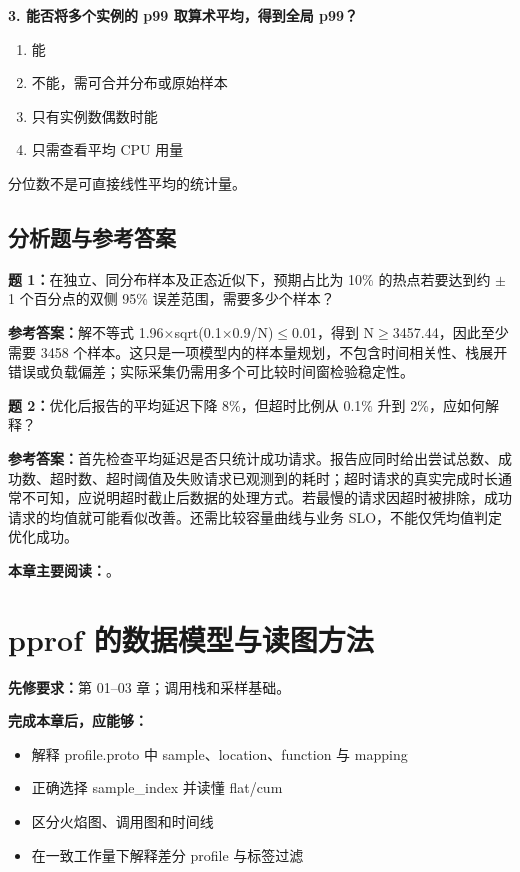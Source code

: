 \documentclass[UTF8,fontset=fandol,openany,11pt]{ctexbook}
\begin{document}
\noindent\textbf{3. 能否将多个实例的 p99 取算术平均，得到全局 p99？}
\begin{enumerate}[label=\Alph*.]
\item 能
\item 不能，需可合并分布或原始样本
\item 只有实例数偶数时能
\item 只需查看平均 CPU 用量
\end{enumerate}
分位数不是可直接线性平均的统计量。

\section{分析题与参考答案}
\noindent\textbf{题 1：}在独立、同分布样本及正态近似下，预期占比为 10\% 的热点若要达到约 \ensuremath{\pm}1 个百分点的双侧 95\% 误差范围，需要多少个样本？

\noindent\textbf{参考答案：}解不等式 1.96\ensuremath{\times}sqrt(0.1\ensuremath{\times}0.9/N)\ensuremath{\leq}0.01，得到 N\ensuremath{\geq}3457.44，因此至少需要 3458 个样本。这只是一项模型内的样本量规划，不包含时间相关性、栈展开错误或负载偏差；实际采集仍需用多个可比较时间窗检验稳定性。

\noindent\textbf{题 2：}优化后报告的平均延迟下降 8\%，但超时比例从 0.1\% 升到 2\%，应如何解释？

\noindent\textbf{参考答案：}首先检查平均延迟是否只统计成功请求。报告应同时给出尝试总数、成功数、超时数、超时阈值及失败请求已观测到的耗时；超时请求的真实完成时长通常不可知，应说明超时截止后数据的处理方式。若最慢的请求因超时被排除，成功请求的均值就可能看似改善。还需比较容量曲线与业务 SLO，不能仅凭均值判定优化成功。

\medskip\noindent\textbf{本章主要阅读：}\cite{go-testing}\cite{go-benchstat}。
\chapter{pprof 的数据模型与读图方法}
\label{ch:04}
\par\medskip
\noindent\textbf{先修要求：}第 01–03 章；调用栈和采样基础。

\noindent\textbf{完成本章后，应能够：}
\begin{itemize}
\item 解释 profile.proto 中 sample、location、function 与 mapping
\item 正确选择 sample\_index 并读懂 flat/cum
\item 区分火焰图、调用图和时间线
\item 在一致工作量下解释差分 profile 与标签过滤
\end{itemize}
\end{document}
